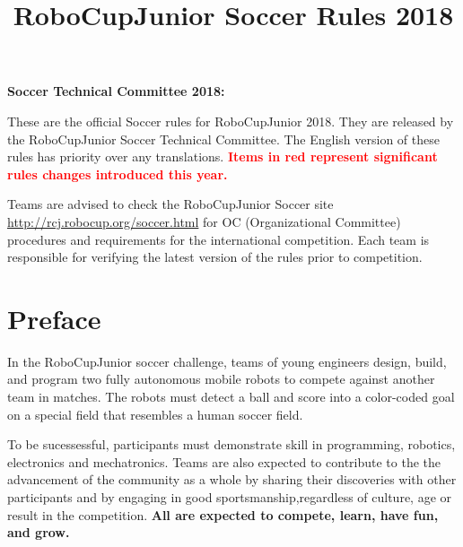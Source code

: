 \documentclass{article}
\title{\vspace{-5ex}RoboCupJunior Soccer Rules 2018\vspace{-5ex}}
\date{\vspace{-2ex}}
\begin{document}
\maketitle
\thispagestyle{firststyle}

\textbf{Soccer Technical Committee 2018:}


These are the official Soccer rules for RoboCupJunior 2018. They are released
by the RoboCupJunior Soccer Technical Committee. The English version of these
rules has priority over any translations. \textcolor{red}{\textbf{Items in red
represent significant rules changes introduced this year.}}

Teams are advised to check the RoboCupJunior Soccer site
\href{http://rcj.robocup.org/soccer.html}{http://rcj.robocup.org/soccer.html}
for OC (Organizational Committee) procedures and requirements for the
international competition. Each team is responsible for verifying the latest version of the
rules prior to competition.

\section*{Preface}

In the RoboCupJunior soccer challenge, teams of young engineers design, build,
and program two fully autonomous mobile robots to compete against another team
in matches. The robots must detect a ball and score into a color-coded goal on
a special field that resembles a human soccer field.

To be sucessessful, participants must demonstrate skill in programming, robotics,
electronics and mechatronics.  Teams are also expected to contribute to the
the advancement of the community as a whole by sharing their discoveries with other
participants and by engaging in good sportsmanship,regardless of culture, age or
result in the competition. \textbf{All are expected to compete,
learn, have fun, and grow.}
\end{document}
